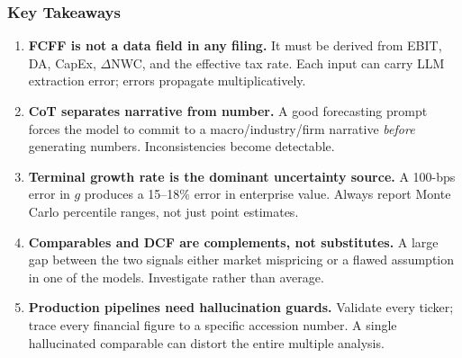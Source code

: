 \documentclass[9pt,t]{beamer}
\begin{document}
\begin{frame}
\frametitle{Key Takeaways}

\begin{enumerate}
  \item \textbf{FCFF is not a data field in any filing.}
        It must be derived from EBIT, DA, CapEx, $\Delta$NWC, and the effective tax rate.
        Each input can carry LLM extraction error; errors propagate multiplicatively.

  \item \textbf{CoT separates narrative from number.}
        A good forecasting prompt forces the model to commit to a macro/industry/firm
        narrative \emph{before} generating numbers. Inconsistencies become detectable.

  \item \textbf{Terminal growth rate is the dominant uncertainty source.}
        A 100-bps error in $g$ produces a 15--18\% error in enterprise value.
        Always report Monte Carlo percentile ranges, not just point estimates.

  \item \textbf{Comparables and DCF are complements, not substitutes.}
        A large gap between the two signals either market mispricing or a flawed assumption
        in one of the models. Investigate rather than average.

  \item \textbf{Production pipelines need hallucination guards.}
        Validate every ticker; trace every financial figure to a specific accession number.
        A single hallucinated comparable can distort the entire multiple analysis.
\end{enumerate}
\end{frame}

\end{document}
